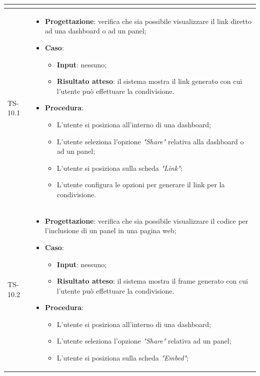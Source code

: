 \begin{longtable}{|C{2.5cm}|C{13cm}|}
\begin{itemize}
\begin{itemize}
	\end{itemize} 
\end{itemize}
	  \\
	\hline
	{TS-10.1} & 
\begin{itemize}
	\item \textbf{Progettazione}: verifica che sia possibile visualizzare il
	link diretto ad una dashboard o ad un panel;
	\item \textbf{Caso}: 
	\begin{itemize}
		\item \textbf{Input}: nessuno;
		\item \textbf{Risultato atteso}: il sistema mostra il link generato con cui l'utente può effettuare la condivisione.
	\end{itemize}
	\item \textbf{Procedura}:
	\begin{itemize}
		\item L'utente si posiziona all'interno di una dashboard;
		\item L'utente seleziona l'opzione \emph{"Share"} relativa alla dashboard o ad un panel;
		\item L'utente si posiziona sulla scheda \emph{"Link"};
		\item L'utente configura le opzioni per generare il link per la condivisione.
	\end{itemize} 
\end{itemize}
	 \\
	\hline
	{TS-10.2} &
\begin{itemize}
	\item \textbf{Progettazione}: verifica che sia  possibile visualizzare il
	codice per l’inclusione di un panel in una pagina web;
	\item \textbf{Caso}: 
	\begin{itemize}
		\item \textbf{Input}: nessuno;
		\item \textbf{Risultato atteso}: il sistema mostra il frame generato con cui l'utente può effettuare la condivisione.
	\end{itemize}
	\item \textbf{Procedura}:
	\begin{itemize}
		\item L'utente si posiziona all'interno di una dashboard;
		\item L'utente seleziona l'opzione \emph{"Share"} relativa ad un panel;
		\item L'utente si posiziona sulla scheda \emph{"Embed"};

\end{itemize}
\end{itemize}
\end{longtable}
